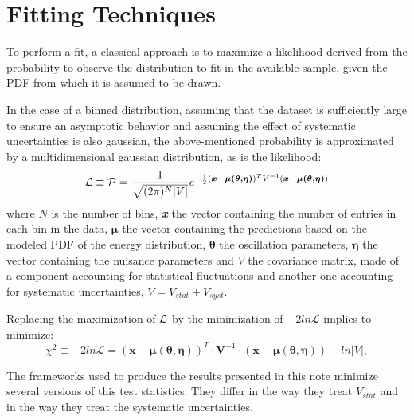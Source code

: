 \section{Fitting Techniques}
\label{app:fit}


To perform a fit, a classical approach is to maximize a likelihood derived from the probability to observe the distribution to fit in the available sample, given the PDF from which it is assumed to be drawn.

In the case of a binned distribution, assuming that the dataset is sufficiently large to ensure an asymptotic behavior and assuming the effect of systematic uncertainties is also gaussian, the above-mentioned probability is approximated by a multidimensional gaussian distribution, as is the likelihood:
\begin{equation}
\label{eq:likelihoodMultiGauss}
	{\cal L} \equiv \mathcal{P}= \frac{1}{\sqrt{(2\pi)^N|V|}}e^{-\frac{1}{2}\left(  \boldsymbol{x-\mu(\theta,\eta)}  \right)^TV^{-1}\left(  \boldsymbol{x-\mu(\theta,\eta)}  \right)  }
\end{equation}
where $N$ is the number of bins, \textit{\textbf{x}} the vector containing the number of entries in each bin in the data,   $\mathbf{\mu}$  the vector containing the predictions based on the modeled PDF of the energy distribution, $\mathbf{\theta}$ the oscillation parameters, $\mathbf{\eta}$ the vector containing the nuisance parameters and $V$ the covariance matrix, made of a component accounting for statistical fluctuations and another one accounting for systematic uncertainties, $V = V_{stat}+V_{syst}$. 

Replacing the maximization of ${\cal L}$ by the minimization of $-2ln\mathcal{L}$ implies to minimize:
\begin{equation}
	\chi^2\equiv-2ln\mathcal{L}=\left(\boldsymbol{x-\mu(\theta,\eta)}\right)^T\cdot \boldsymbol V^{-1}\cdot \left(\boldsymbol{x-\mu(\theta,\eta)}\right)+ln|V|,
	\label{eq:chi_sq}
\end{equation}

The frameworks used to produce the results presented in this note minimize several versions of this test statistics. They differ in the way they treat $V_{stat}$ and in the way they treat the systematic uncertainties. 


